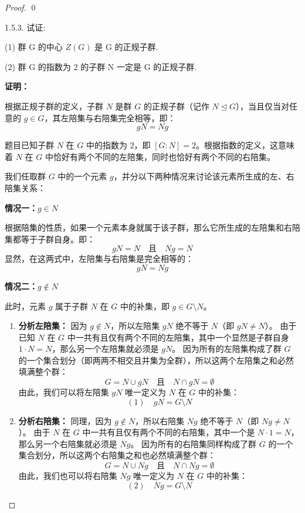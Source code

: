 \documentclass[]{article}
\begin{document}
\begin{proof}
\qed

1.5.3. 试证: 

(1) 群 G 的中心 $Z(G)$ 是 G 的正规子群. 

(2) 群 G 的指数为 2 的子群 N 一定是 G 的正规子群. 

\bigskip
\noindent \textbf{证明：} 

根据正规子群的定义，子群 $N$ 是群 $G$ 的正规子群（记作 $N \trianglelefteq G$），当且仅当对任意的 $g \in G$，其左陪集与右陪集完全相等，即：
\[ gN = Ng \]

题目已知子群 $N$ 在 $G$ 中的指数为 2，即 $[G : N] = 2$。根据指数的定义，这意味着 $N$ 在 $G$ 中恰好有两个不同的左陪集，同时也恰好有两个不同的右陪集。

我们任取群 $G$ 中的一个元素 $g$，并分以下两种情况来讨论该元素所生成的左、右陪集关系：

\bigskip
\noindent \textbf{情况一：$g \in N$}

根据陪集的性质，如果一个元素本身就属于该子群，那么它所生成的左陪集和右陪集都等于子群自身。即：
\[ gN = N \quad \text{且} \quad Ng = N \]
显然，在这两式中，左陪集与右陪集是完全相等的：
\[ gN = Ng \]

\bigskip
\noindent \textbf{情况二：$g \notin N$}

此时，元素 $g$ 属于子群 $N$ 在 $G$ 中的补集，即 $g \in G \setminus N$。

\begin{enumerate}
	\item \textbf{分析左陪集：}
	因为 $g \notin N$，所以左陪集 $gN$ 绝不等于 $N$（即 $gN \neq N$）。
	由于已知 $N$ 在 $G$ 中一共有且仅有两个不同的左陪集，其中一个显然是子群自身 $1 \cdot N = N$，那么另一个左陪集就必须是 $gN$。
	因为所有的左陪集构成了群 $G$ 的一个集合划分（即两两不相交且并集为全群），所以这两个左陪集之和必然填满整个群：
	\[ G = N \cup gN \quad \text{且} \quad N \cap gN = \emptyset \]
	由此，我们可以将左陪集 $gN$ 唯一定义为 $N$ 在 $G$ 中的补集：
	\[ (1) \quad gN = G \setminus N \]
	
	\item \textbf{分析右陪集：}
	同理，因为 $g \notin N$，所以右陪集 $Ng$ 绝不等于 $N$（即 $Ng \neq N$）。
	由于 $N$ 在 $G$ 中一共有且仅有两个不同的右陪集，其中一个是 $N \cdot 1 = N$，那么另一个右陪集就必须是 $Ng$。
	因为所有的右陪集同样构成了群 $G$ 的一个集合划分，所以这两个右陪集之和也必然填满整个群：
	\[ G = N \cup Ng \quad \text{且} \quad N \cap Ng = \emptyset \]
	由此，我们也可以将右陪集 $Ng$ 唯一定义为 $N$ 在 $G$ 中的补集：
	\[ (2) \quad Ng = G \setminus N \]
\end{enumerate}


\end{proof}
\end{document}
